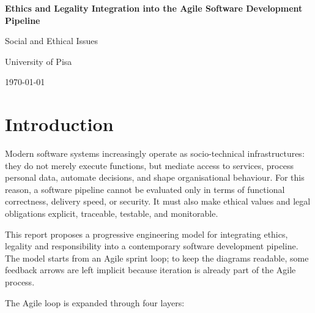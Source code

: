 \documentclass[11pt,a4paper]{article}
\begin{document}
\begin{titlepage}
    \centering
    \vspace{3.0cm}
    {\huge \textbf{Ethics and Legality Integration into the Agile Software Development Pipeline}\par}
    \vspace{1.5cm}
    {\large Social and Ethical Issues\par}
    \vfill
    {University of Pisa\par}
    {\large \today\par}
\end{titlepage}

\thispagestyle{plain}
\tableofcontents
\clearpage



\section{Introduction}

Modern software systems increasingly operate as socio-technical infrastructures: they do not merely execute functions, but mediate access to services, process personal data, automate decisions, and shape organisational behaviour. For this reason, a software pipeline cannot be evaluated only in terms of functional correctness, delivery speed, or security. It must also make ethical values and legal obligations explicit, traceable, testable, and monitorable.

This report proposes a progressive engineering model for integrating ethics, legality and responsibility into a contemporary software development pipeline. The model starts from an Agile sprint loop; to keep the diagrams readable, some feedback arrows are left implicit because iteration is already part of the Agile process.

The Agile loop is expanded through four layers:
\end{document}
